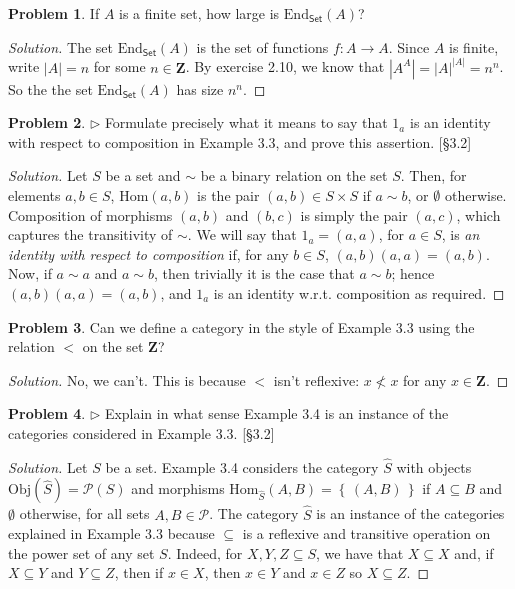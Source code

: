 \documentclass[fontsize=14pt]{scrartcl}
\theoremstyle{definition}
\newtheorem{problem-internal}{Problem}[subsection]
\newenvironment{problem}{
  \medskip
  \begin{problem-internal}
}{
  \end{problem-internal}
}
\newenvironment{solution}{
  \begin{proof}[Solution]
  \vspace{-8px}
  \setlength{\parskip}{4px}
  \setlength{\parindent}{0px}
}{
  \end{proof}
}
\newcommand{\set}[1]{\left\{\,#1\,\right\}}
\newcommand{\Obj}{\mathrm{Obj}}
\newcommand{\Hom}{\mathrm{Hom}}
\newcommand{\abs}[1]{\left|#1\right|}
\begin{document}
\begin{problem}
If $A$ is a finite set, how large is $\mathrm{End}_{\mathsf{Set}}(A)$?
\end{problem}

\begin{solution}
The set $\mathrm{End}_{\mathsf{Set}}(A)$ is the set of functions $f:A\to A$.
Since $A$ is finite, write $\abs{A} = n$ for some $n\in\mathbf{Z}$. By exercise
2.10, we know that $\abs{A^A} = \abs{A}^{\abs{A}} = n^n$. So the the set
$\mathrm{End}_{\mathsf{Set}}(A)$ has size $n^n$.
\end{solution}


\begin{problem}
$\rhd$ Formulate precisely what it means to say that $1_a$ is an identity with
respect to composition in Example 3.3, and prove this assertion. [\S3.2]
\end{problem}

\begin{solution}
Let $S$ be a set and $\sim$ be a binary relation on the set $S$. Then, for
elements $a,b\in S$, $\Hom(a,b)$ is the pair $(a,b)\in S\times S$ if $a\sim b$,
or $\emptyset$ otherwise. Composition of morphisms $(a,b)$ and $(b,c)$ is simply
the pair $(a,c)$, which captures the transitivity of $\sim$. We will say that
$1_a = (a,a)$, for $a\in S$, is \textit{an identity with respect to composition}
if, for any $b\in S$, $(a,b)(a,a) = (a,b)$. Now, if $a\sim a$ and $a\sim b$,
then trivially it is the case that $a\sim b$; hence $(a,b)(a,a) = (a,b)$, and
$1_a$ is an identity w.r.t. composition as required.
\end{solution}


\begin{problem}
Can we define a category in the style of Example 3.3 using the relation $<$ on
the set $\mathbf{Z}$?
\end{problem}

\begin{solution}
No, we can't. This is because $<$ isn't reflexive: $x\not<x$ for any
$x\in\mathbf{Z}$.
\end{solution}


\begin{problem}
$\rhd$ Explain in what sense Example 3.4 is an instance of the categories
considered in Example 3.3. [\S 3.2]
\end{problem}

\begin{solution}
Let $S$ be a set. Example 3.4 considers the category $\hat{S}$ with objects
$\Obj(\hat{S}) = \mathscr{P}(S)$ and morphisms $\Hom_{\hat{S}}(A,B) =
\set{(A,B)}$ if $A\subseteq B$ and $\emptyset$ otherwise, for all sets
$A,B\in\mathscr{P}$. The category $\hat{S}$ is an instance of the categories
explained in Example 3.3 because $\subseteq$ is a reflexive and transitive
operation on the power set of any set $S$. Indeed, for $X,Y,Z\subseteq S$, we have
that $X\subseteq X$ and, if $X\subseteq Y$ and $Y\subseteq Z$, then if $x\in X$,
then $x\in Y$ and $x\in Z$ so $X\subseteq Z$.
\end{solution}
\end{document}
